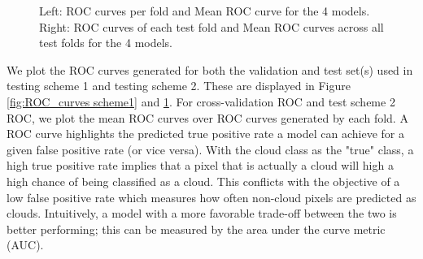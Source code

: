 \documentclass[11pt, letterpaper, journal]{IEEEtran}
\begin{document}
\begin{figure}
    \centering
    \qquad
    \caption{Left: ROC curves per fold and Mean ROC curve for the 4 models. Right: ROC curves of each test fold and Mean ROC curves across all test folds for the 4 models.}
    \label{fig:ROC_curves scheme2}
\end{figure}

We plot the ROC curves generated for both the validation and test set(s) used in testing scheme 1 and testing scheme 2. These are displayed in Figure \ref{fig:ROC_curves scheme1} and \ref{fig:ROC_curves scheme2}. For cross-validation ROC and test scheme 2 ROC, we plot the mean ROC curves over ROC curves generated by each fold. A ROC curve highlights the predicted true positive rate a model can achieve for a given false positive rate (or vice versa). With the cloud class as the "true" class, a high true positive rate implies that a pixel that is actually a cloud will high a high chance of being classified as a cloud. This conflicts with the objective of a low false positive rate which measures how often non-cloud pixels are predicted as clouds. Intuitively, a model with a more favorable trade-off between the two is better performing; this can be measured by the area under the curve metric (AUC).
\end{document}
